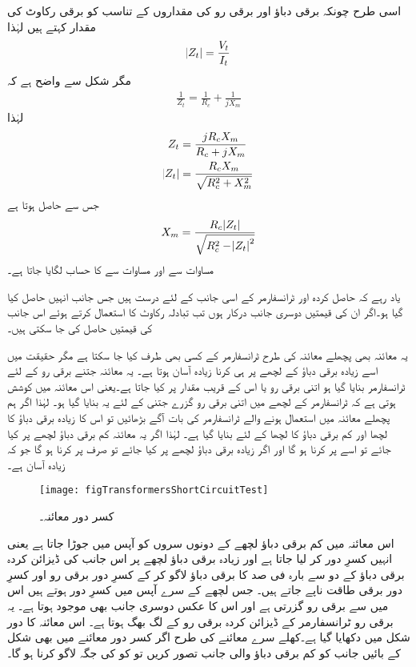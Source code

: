 اسی طرح چونکہ برقی دباؤ اور برقی رو کی مقداروں کے تناسب کو برقی رکاوٹ کی مقدار کہتے ہیں لہٰذا
\begin{align*}
\abs{Z_t}=\frac{V_t}{I_t}
\end{align*}
مگر شکل   سے واضح ہے کہ
\begin{align*}
\frac{1}{Z_t}=\frac{1}{R_c}+\frac{1}{j X_m}
\end{align*}
لہٰذا
\begin{align*}
Z_t&=\frac{j R_c X_m}{R_c+j X_m}\\
\abs{Z_t}&=\frac{R_c X_m}{\sqrt{R_c^2+X_m^2}}
\end{align*}
جس سے حاصل ہوتا ہے
\begin{align}\label{مساوات_ٹرانسفارمر_کھلے_دور_امالہ_حاصل}
X_m=\frac{R_c \abs{Z_t}}{\sqrt{R_c^2-\abs{Z_t}^2}}
\end{align}
مساوات   سے  اور  مساوات   سے    کا حساب لگایا جاتا ہے۔

یاد رہے کہ حاصل کردہ  اور  ٹرانسفارمر کے اسی جانب کے لئے درست ہیں جس جانب انہیں حاصل کیا گیا ہو۔اگر ان کی قیمتیں دوسری جانب درکار ہوں تب تبادلہ رکاوٹ کا استعمال کرتے ہوئے اس جانب کی قیمتیں حاصل کی جا سکتی ہیں۔ 

یہ معائنہ بھی پچھلے معائنہ کی طرح ٹرانسفارمر کے کسی بھی طرف کیا جا سکتا ہے مگر حقیقت میں اسے زیادہ برقی دباؤ کے لچھے پر ہی کرنا زیادہ آسان ہوتا ہے۔ یہ معائنہ جتنے برقی رو کے لئے ٹرانسفارمر بنایا گیا ہو اتنی برقی رو یا اس کے قریب مقدار پر کیا جاتا ہے۔یعنی اس معائنہ میں کوشش ہوتی ہے کہ ٹرانسفارمر کے لچھے میں اتنی برقی رو گزرے جتنی کے لئے یہ بنایا گیا ہو۔ لہٰذا اگر ہم پچھلے معائنہ میں استعمال ہونے والے ٹرانسفارمر کی بات آگے بڑھائیں تو اس کا زیادہ برقی دباؤ کا لچھا  اور کم برقی دباؤ کا لچھا  کے لئے بنایا گیا ہے۔ لہٰذا اگر یہ معائنہ کم برقی دباؤ لچھے پر کیا جائے تو اسے   پر  کرنا ہو گا اور اگر زیادہ برقی دباؤ لچھے پر کیا جائے تو صرف  پر کرنا ہو گا جو کہ زیادہ آسان ہے۔
\begin{figure}
\centering
\texttt{[image: figTransformersShortCircuitTest]}
\caption{کسر دور معائنہ۔}
\label{شکل_ٹرانسفارمر_کسر_دور_معائنہ}
\end{figure}

اس معائنہ میں کم برقی دباؤ لچھے کے دونوں سروں کو آپس میں جوڑا جاتا ہے یعنی انہیں کسرِ دور کر لیا جاتا ہے اور زیادہ برقی دباؤ لچھے پر اس جانب کی ڈیزائن کردہ برقی دباؤ کے دو سے بارہ  فی صد کا برقی دباؤ  لاگو کر کے کسرِ دور برقی رو  اور کسرِ دور برقی طاقت  ناپے جاتے ہیں۔ جس لچھے کے سرے آپس میں کسرِ دور ہوتے ہیں اس میں سے برقی رو گزرتی ہے اور اس کا عکس دوسری جانب بھی موجود ہوتا ہے۔ یہ برقی رو ٹرانسفارمر کے ڈیزائن کردہ برقی رو کے لگ بھگ ہوتا ہے۔ اس معائنہ کا دور شکل  میں دکھایا گیا ہے۔کھلے سرے معائنے کی طرح اگر کسر دور معائنے میں بھی  شکل  کے بائیں جانب کو کم برقی دباؤ والی جانب تصور کریں تو   کو   کی جگہ لاگو کرنا ہو گا۔

